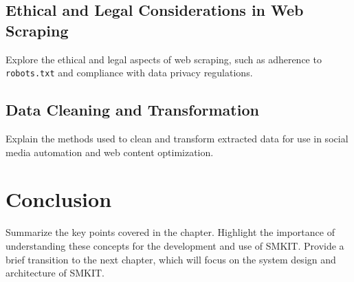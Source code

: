 \subsection{Ethical and Legal Considerations in Web Scraping}
\label{subsec:ethical_and_legal_considerations_in_web_scraping}
Explore the ethical and legal aspects of web scraping, such as adherence to \texttt{robots.txt} and compliance with data privacy regulations.

\subsection{Data Cleaning and Transformation}
\label{subsec:data_cleaning_and_transformation}
Explain the methods used to clean and transform extracted data for use in social media automation and web content optimization.

\section{Conclusion}
\label{sec:preliminaries_conclusion}
Summarize the key points covered in the chapter.
Highlight the importance of understanding these concepts for the development and use of SMKIT. Provide a brief transition to the next chapter, which will focus on the system design and architecture of SMKIT.
